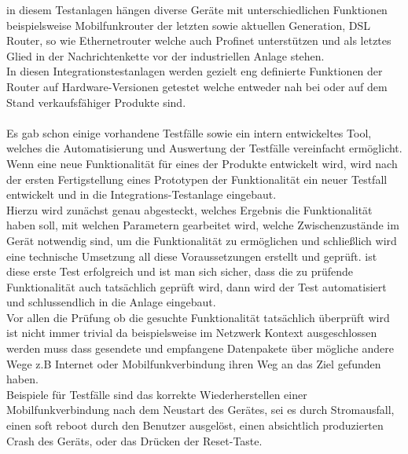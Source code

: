  in diesem Testanlagen hängen diverse Geräte mit unterschiedlichen Funktionen beispielsweise Mobilfunkrouter der letzten sowie aktuellen Generation, DSL Router, so wie Ethernetrouter  welche auch Profinet unterstützen und als letztes Glied in der Nachrichtenkette vor der industriellen Anlage stehen.
 \\
 In diesen Integrationstestanlagen werden gezielt eng definierte Funktionen der Router auf  Hardware-Versionen getestet welche entweder nah bei oder auf dem Stand verkaufsfähiger Produkte sind.  \\
\\
Es gab schon einige vorhandene Testfälle sowie ein intern entwickeltes Tool, welches die Automatisierung und Auswertung der Testfälle vereinfacht ermöglicht. 
Wenn eine neue Funktionalität für eines der Produkte entwickelt wird, wird nach der ersten Fertigstellung eines Prototypen der Funktionalität ein neuer Testfall entwickelt und in die Integrations-Testanlage eingebaut.  \\
Hierzu wird zunächst genau abgesteckt, welches Ergebnis die Funktionalität haben soll, mit welchen Parametern gearbeitet wird, welche Zwischenzustände im Gerät notwendig sind, um die Funktionalität zu ermöglichen und schließlich wird eine technische Umsetzung all diese Voraussetzungen erstellt und geprüft. ist diese erste Test erfolgreich und ist man sich sicher, dass die zu prüfende Funktionalität auch tatsächlich geprüft wird, dann wird  der Test automatisiert und schlussendlich in die Anlage eingebaut. \\
Vor  allen  die Prüfung ob die gesuchte Funktionalität tatsächlich überprüft wird ist nicht immer trivial da beispielsweise im Netzwerk Kontext ausgeschlossen werden muss dass gesendete und empfangene Datenpakete über mögliche andere Wege z.B Internet oder Mobilfunkverbindung ihren Weg an das Ziel gefunden haben.\\
Beispiele für Testfälle sind das korrekte Wiederherstellen einer Mobilfunkverbindung nach dem Neustart des Gerätes, sei es durch Stromausfall, einen soft reboot durch den Benutzer ausgelöst, einen absichtlich produzierten Crash des Geräts, oder das Drücken der Reset-Taste. \\
